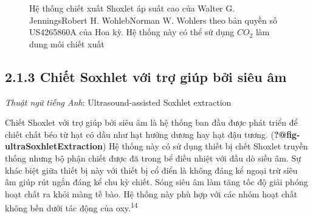 \documentclass[
  twocolumn,
  landscape]{report}
\begin{document}
\begin{figure}


\caption{\label{fig-HighpressureShoxletExtractor}Hệ thống chiết xuất
Shoxlet áp suất cao của Walter G. JenningsRobert H. WohlebNorman W.
Wohlers theo bản quyền số US4265860A của Hoa kỳ. Hệ thống này có thể sử
dụng \(CO_2\) làm dung môi chiết xuất}

\end{figure}%

\subsection{2.1.3 Chiết Soxhlet với trợ giúp bởi siêu
âm}\label{chiux1ebft-soxhlet-vux1edbi-trux1ee3-giuxfap-bux1edfi-siuxeau-uxe2m}

\emph{Thuật ngữ tiếng Anh}: Ultrasound-assisted Soxhlet extraction

Chiết Shoxlet với trợ giúp bởi siêu âm là hệ thống ban đầu được phát
triển để chiết chất béo từ hạt có dầu như hạt hướng dương hay hạt đậu
tương. (\textbf{?@fig-ultraSoxhletExtraction}) Hệ thống này có sử dụng
thiết bị chết Shoxlet truyền thống nhưng bộ phận chiết được đă trong bể
điều nhiệt với đầu dò siều âm. Sự khác biệt giữa thiết bị này với thiết
bị cổ điển là không đáng kể ngoại trừ siêu âm giúp rút ngắn đáng kể chu
kỳ chiết. Sóng siêu âm làm tăng tốc độ giải phóng hoạt chất ra khỏi màng
tế bào. Hệ thống này phù hợp với các nhóm hoạt chất không bền dưới tác
động của oxy.\textsuperscript{14}
\end{document}

